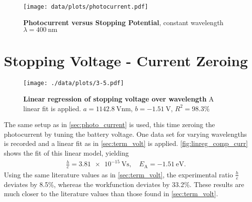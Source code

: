 \begin{figure}[tbp]
	\centering
	\texttt{[image: data/plots/photocurrent.pdf]}
	\caption[Photocurrent versus Stopping Potential]{\textbf{Photocurrent versus Stopping Potential}, constant wavelength $\lambda = \SI{400}{\nm}$}
	\label{plt:photocurrent}
\end{figure}

\section{Stopping Voltage - Current Zeroing}%
\begin{figure}[tbp]
	\centering
	\texttt{[image: ./data/plots/3-5.pdf]}
	\caption[Linear regression of stopping voltage over wavelength]{\textbf{Linear regression of stopping voltage over wavelength} A linear fit is applied. $a=\SI{1142.8}{\volt\nm}$, $b=\SI{-1.51}{\V}$, $R^2=98.3\%$}
	\label{fig:linreg_comp_curr}
\end{figure}
The same setup as in \autoref{sec:photo_current} is used, this time zeroing the photocurrent by tuning the battery voltage.
One data set for varying wavelengths is recorded and a linear fit as in \autoref{sec:term_volt} is applied.
\autoref{fig:linreg_comp_curr} shows the fit of this linear model, yielding
\begin{gather*}
	\frac{h}{e}=\SI{3.81e-15}{\volt\second},\quad E_\text{A}=\SI{-1.51}{\eV}.
\end{gather*}
Using the same literature values as in \autoref{sec:term_volt}, the experimental ratio $\frac{h}{e}$ deviates by \num{8.5}\%, whereas the workfunction deviates by \num{33.2}\%.
These results are much closer to the literature values than those found in \autoref{sec:term_volt}.
